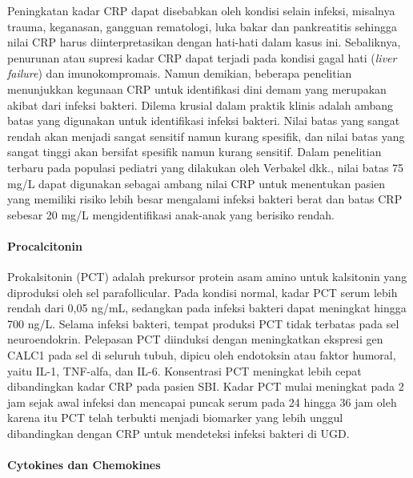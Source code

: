\documentclass[
  10pt,
  letterpaper,
]{article}
\begin{document}
Peningkatan kadar CRP dapat disebabkan oleh kondisi selain infeksi,
misalnya trauma, keganasan, gangguan rematologi, luka bakar dan
pankreatitis sehingga nilai CRP harus diinterpretasikan dengan hati-hati
dalam kasus ini.\citep{pepys2003} Sebaliknya, penurunan atau supresi
kadar CRP dapat terjadi pada kondisi gagal hati (\emph{liver failure})
dan imunokompromais.\citep{dyer2018} Namun demikian, beberapa penelitian
menunjukkan kegunaan CRP untuk identifikasi dini demam yang merupakan
akibat dari infeksi bakteri.\citep{verbakel2017} Dilema krusial dalam
praktik klinis adalah ambang batas yang digunakan untuk identifikasi
infeksi bakteri. Nilai batas yang sangat rendah akan menjadi sangat
sensitif namun kurang spesifik, dan nilai batas yang sangat tinggi akan
bersifat spesifik namun kurang sensitif. Dalam penelitian terbaru pada
populasi pediatri yang dilakukan oleh Verbakel dkk., nilai batas 75 mg/L
dapat digunakan sebagai ambang nilai CRP untuk menentukan pasien yang
memiliki risiko lebih besar mengalami infeksi bakteri berat dan batas
CRP sebesar 20 mg/L mengidentifikasi anak-anak yang berisiko rendah.

\paragraph{Procalcitonin}\label{procalcitonin}

Prokalsitonin (PCT) adalah prekursor protein asam amino untuk kalsitonin
yang diproduksi oleh sel parafollicular. Pada kondisi normal, kadar PCT
serum lebih rendah dari 0,05 ng/mL, sedangkan pada infeksi bakteri dapat
meningkat hingga 700 ng/L. Selama infeksi bakteri, tempat produksi PCT
tidak terbatas pada sel neuroendokrin. Pelepasan PCT diinduksi dengan
meningkatkan ekspresi gen CALC1 pada sel di seluruh tubuh, dipicu oleh
endotoksin atau faktor humoral, yaitu IL-1, TNF-alfa, dan IL-6.
Konsentrasi PCT meningkat lebih cepat dibandingkan kadar CRP pada pasien
SBI. Kadar PCT mulai meningkat pada 2 jam sejak awal infeksi dan
mencapai puncak serum pada 24 hingga 36 jam oleh karena itu PCT telah
terbukti menjadi biomarker yang lebih unggul dibandingkan dengan CRP
untuk mendeteksi infeksi bakteri di
UGD.\citep{Principi2017, bernardi2024}

\paragraph{Cytokines dan Chemokines}\label{cytokines-dan-chemokines}
\end{document}
